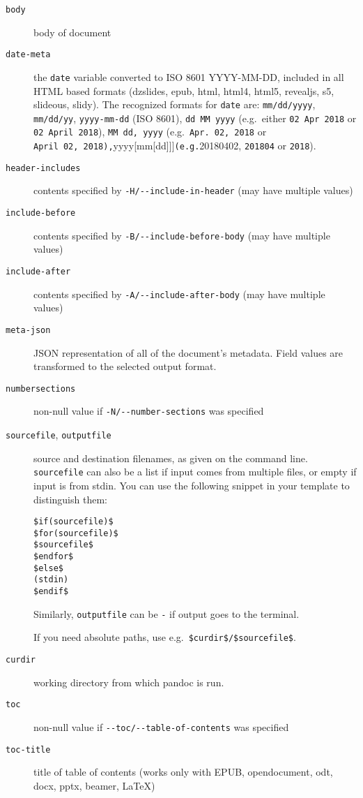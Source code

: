 \documentclass[
  12pt,
  a4paper,
]{article}
\begin{document}
\begin{description}
\item[\texttt{body}]
body of document
\item[\texttt{date-meta}]
the \texttt{date} variable converted to ISO 8601 YYYY-MM-DD, included in all HTML based formats
(dzslides, epub, html, html4, html5, revealjs, s5, slideous, slidy). The recognized formats for
\texttt{date} are: \texttt{mm/dd/yyyy}, \texttt{mm/dd/yy}, \texttt{yyyy-mm-dd} (ISO 8601),
\texttt{dd\ MM\ yyyy} (e.g.~either \texttt{02\ Apr\ 2018} or \texttt{02\ April\ 2018}),
\texttt{MM\ dd,\ yyyy} (e.g.~\texttt{Apr.\ 02,\ 2018} or
\texttt{April\ 02,\ 2018),}yyyy{[}mm{[}dd{]}{]}{]}\texttt{(e.g.}20180402, \texttt{201804} or
\texttt{2018}).
\item[\texttt{header-includes}]
contents specified by \texttt{-H/-\/-include-in-header} (may have multiple values)
\item[\texttt{include-before}]
contents specified by \texttt{-B/-\/-include-before-body} (may have multiple values)
\item[\texttt{include-after}]
contents specified by \texttt{-A/-\/-include-after-body} (may have multiple values)
\item[\texttt{meta-json}]
JSON representation of all of the document's metadata. Field values are transformed to the
selected output format.
\item[\texttt{numbersections}]
non-null value if \texttt{-N/-\/-number-sections} was specified
\item[\texttt{sourcefile}, \texttt{outputfile}]
source and destination filenames, as given on the command line. \texttt{sourcefile} can also be a
list if input comes from multiple files, or empty if input is from stdin. You can use the
following snippet in your template to distinguish them:

\begin{verbatim}
$if(sourcefile)$
$for(sourcefile)$
$sourcefile$
$endfor$
$else$
(stdin)
$endif$
\end{verbatim}

Similarly, \texttt{outputfile} can be \texttt{-} if output goes to the terminal.

If you need absolute paths, use e.g.~\texttt{\$curdir\$/\$sourcefile\$}.
\item[\texttt{curdir}]
working directory from which pandoc is run.
\item[\texttt{toc}]
non-null value if \texttt{-\/-toc/-\/-table-of-contents} was specified
\item[\texttt{toc-title}]
title of table of contents (works only with EPUB, opendocument, odt, docx, pptx, beamer, LaTeX)
\end{description}
\end{document}
